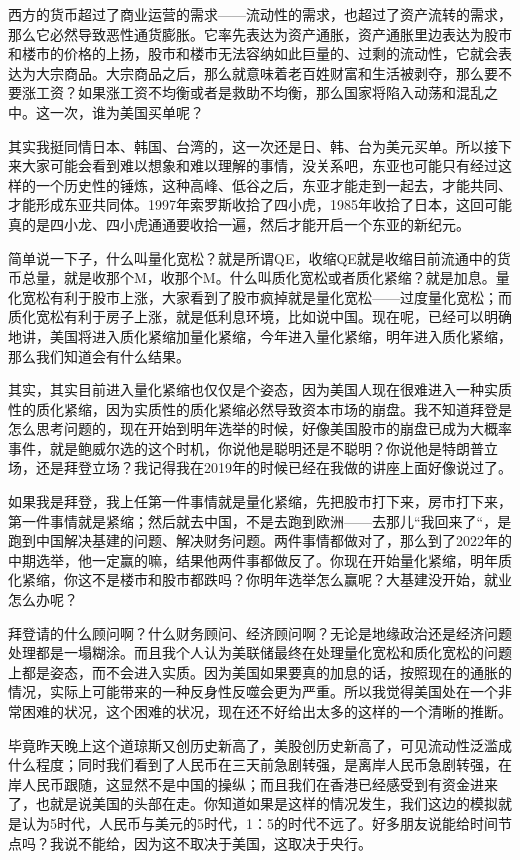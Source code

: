 \documentclass[UTF8, 12pt, a4paper]{ctexrep}
\begin{document}
西方的货币超过了商业运营的需求——流动性的需求，也超过了资产流转的需求，那么它必然导致恶性通货膨胀。它率先表达为资产通胀，资产通胀里边表达为股市和楼市的价格的上扬，股市和楼市无法容纳如此巨量的、过剩的流动性，它就会表达为大宗商品。大宗商品之后，那么就意味着老百姓财富和生活被剥夺，那么要不要涨工资？如果涨工资不均衡或者是救助不均衡，那么国家将陷入动荡和混乱之中。这一次，谁为美国买单呢？

其实我挺同情日本、韩国、台湾的，这一次还是日、韩、台为美元买单。所以接下来大家可能会看到难以想象和难以理解的事情，没关系吧，东亚也可能只有经过这样的一个历史性的锤炼，这种高峰、低谷之后，东亚才能走到一起去，才能共同、才能形成东亚共同体。1997年索罗斯收拾了四小虎，1985年收拾了日本，这回可能真的是四小龙、四小虎通通要收拾一遍，然后才能开启一个东亚的新纪元。

简单说一下子，什么叫量化宽松？就是所谓QE，收缩QE就是收缩目前流通中的货币总量，就是收那个M，收那个M。什么叫质化宽松或者质化紧缩？就是加息。量化宽松有利于股市上涨，大家看到了股市疯掉就是量化宽松——过度量化宽松；而质化宽松有利于房子上涨，就是低利息环境，比如说中国。现在呢，已经可以明确地讲，美国将进入质化紧缩加量化紧缩，今年进入量化紧缩，明年进入质化紧缩，那么我们知道会有什么结果。

其实，其实目前进入量化紧缩也仅仅是个姿态，因为美国人现在很难进入一种实质性的质化紧缩，因为实质性的质化紧缩必然导致资本市场的崩盘。我不知道拜登是怎么思考问题的，现在开始到明年选举的时候，好像美国股市的崩盘已成为大概率事件，就是鲍威尔选的这个时机，你说他是聪明还是不聪明？你说他是特朗普立场，还是拜登立场？我记得我在2019年的时候已经在我做的讲座上面好像说过了。

如果我是拜登，我上任第一件事情就是量化紧缩，先把股市打下来，房市打下来，第一件事情就是紧缩；然后就去中国，不是去跑到欧洲——去那儿“我回来了“，是跑到中国解决基建的问题、解决财务问题。两件事情都做对了，那么到了2022年的中期选举，他一定赢的嘛，结果他两件事都做反了。你现在开始量化紧缩，明年质化紧缩，你这不是楼市和股市都跌吗？你明年选举怎么赢呢？大基建没开始，就业怎么办呢？

拜登请的什么顾问啊？什么财务顾问、经济顾问啊？无论是地缘政治还是经济问题处理都是一塌糊涂。而且我个人认为美联储最终在处理量化宽松和质化宽松的问题上都是姿态，而不会进入实质。因为美国如果要真的加息的话，按照现在的通胀的情况，实际上可能带来的一种反身性反噬会更为严重。所以我觉得美国处在一个非常困难的状况，这个困难的状况，现在还不好给出太多的这样的一个清晰的推断。

毕竟昨天晚上这个道琼斯又创历史新高了，美股创历史新高了，可见流动性泛滥成什么程度；同时我们看到了人民币在三天前急剧转强，是离岸人民币急剧转强，在岸人民币跟随，这显然不是中国的操纵；而且我们在香港已经感受到有资金进来了，也就是说美国的头部在走。你知道如果是这样的情况发生，我们这边的模拟就是认为5时代，人民币与美元的5时代，1：5的时代不远了。好多朋友说能给时间节点吗？我说不能给，因为这不取决于美国，这取决于央行。
\end{document}
